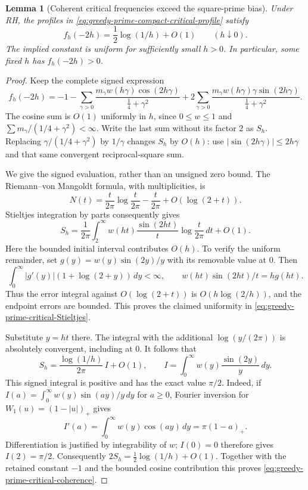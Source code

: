\documentclass[11pt]{article}
\newtheorem{lemma}[theorem]{Lemma}
\theoremstyle{definition}
\begin{document}
\begin{lemma}[Coherent critical frequencies exceed the square-prime bias]
\label{lem:greedy-prime-critical-coherence}
Under RH, the profiles in
\eqref{eq:greedy-prime-compact-critical-profile} satisfy
\begin{equation}
                  f_h(-2h)=\frac12\log(1/h)+O(1)
                         \qquad(h\downarrow0).
 \label{eq:greedy-prime-critical-coherence}
\end{equation}
The implied constant is uniform for sufficiently small $h>0$.
In particular, some fixed $h$ has $f_h(-2h)>0$.
\end{lemma}

\begin{proof}
Keep the complete signed expression
\[
 f_h(-2h)=-1-
 \sum_{\gamma>0}\frac{m_\gamma w(h\gamma)\cos(2h\gamma)}
                         {\tfrac14+\gamma^2}
 +2\sum_{\gamma>0}
       \frac{m_\gamma w(h\gamma)\gamma\sin(2h\gamma)}
                         {\tfrac14+\gamma^2}.
\]
The cosine sum is $O(1)$ uniformly in $h$, since $0\le w\le1$
and $\sum m_\gamma/(1/4+\gamma^2)<\infty$.
Write the last sum without its factor $2$ as $S_h$.
Replacing $\gamma/(1/4+\gamma^2)$ by $1/\gamma$ changes $S_h$
by $O(h)$: use $|\sin(2h\gamma)|\le2h\gamma$ and that same
convergent reciprocal-square sum.

We give the signed evaluation, rather than an unsigned zero bound.
The Riemann--von Mangoldt formula, with multiplicities, is
\[
 N(t)=\frac{t}{2\pi}\log\frac{t}{2\pi}
                     -\frac{t}{2\pi}+O(\log(2+t)).
\]
Stieltjes integration by parts consequently gives
\begin{equation}
 S_h=\frac1{2\pi}\int_2^\infty
       w(ht)\frac{\sin(2ht)}t\log\frac{t}{2\pi}\,dt+O(1).
 \label{eq:greedy-prime-critical-Stieltjes}
\end{equation}
Here the bounded initial interval contributes $O(h)$.
To verify the uniform remainder, set
$g(y)=w(y)\sin(2y)/y$ with its removable value at $0$.
Then
\[
 \int_0^\infty |g'(y)|(1+\log(2+y))\,dy<\infty,
 \qquad w(ht)\sin(2ht)/t=h g(ht).
\]
Thus the error integral against $O(\log(2+t))$ is
$O(h\log(2/h))$, and the endpoint errors are bounded.
This proves the claimed uniformity in
\eqref{eq:greedy-prime-critical-Stieltjes}.

Substitute $y=ht$ there. The integral with the additional
$\log(y/(2\pi))$ is absolutely convergent, including at $0$.
It follows that
\[
 S_h=\frac{\log(1/h)}{2\pi}\,I+O(1),\qquad
 I=\int_0^\infty w(y)\frac{\sin(2y)}y\,dy.
\]
This signed integral is positive and has the exact value $\pi/2$.
Indeed, if $I(a)=\int_0^\infty w(y)\sin(ay)/y\,dy$ for $a\ge0$,
Fourier inversion for $W_1(u)=(1-|u|)_+$ gives
\[
 I'(a)=\int_0^\infty w(y)\cos(ay)\,dy
                         =\pi(1-a)_+.
\]
Differentiation is justified by integrability of $w$;
$I(0)=0$ therefore gives $I(2)=\pi/2$.
Consequently $2S_h=\tfrac12\log(1/h)+O(1)$.
Together with the retained constant $-1$ and the bounded
cosine contribution this proves
\eqref{eq:greedy-prime-critical-coherence}.
\end{proof}
\end{document}
